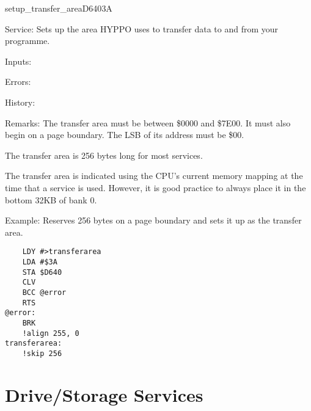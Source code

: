%
\newpage
\begin{hyppotrap}{setup\_transfer\_area}{D640}{3A}
\item [Service:]
  Sets up the area HYPPO uses to transfer data to and from your programme.
\item [Inputs:]
\item [Errors:]
\item [History:]
\item [Remarks:]
  The transfer area must be between \$0000 and \$7E00. It must also begin on a
  page boundary. The LSB of its address must be \$00.

  The transfer area is 256 bytes long for most services.

  The transfer area is indicated using the CPU's current memory mapping at
  the time that a service is used. However, it is good practice to always
  place it in the bottom 32KB of bank 0.
\item [Example:]
  Reserves 256 bytes on a page boundary and sets it up as the transfer area.
\begin{tcolorbox}[colback=black,coltext=white]
\verbatimfont{\codefont}
\begin{verbatim}
    LDY #>transferarea
    LDA #$3A
    STA $D640
    CLV
    BCC @error
    RTS
@error:
    BRK
    !align 255, 0
transferarea:
    !skip 256
\end{verbatim}
\end{tcolorbox}
\end{hyppotrap}



\newpage
\section{Drive/Storage Services}


